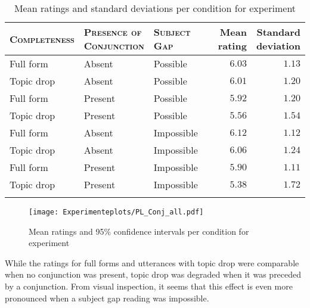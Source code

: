\begin{table}
\caption{Mean ratings and standard deviations per condition for experiment }
\centering
\begin{tabular}{lllrr}
\lsptoprule
\textsc{Completeness} & \Centerstack[l]{\textsc{Presence of}\\\textsc{Conjunction}} & \textsc{Subject Gap} & \Centerstack{Mean\\rating} & \Centerstack{Standard\\deviation} \\
\midrule
Full form & Absent & Possible &  $6.03$ &  $1.13$\\
Topic drop & Absent & Possible &  $6.01$ & $1.20$ \\
Full form & Present & Possible &  $5.92$ & $1.20$ \\
Topic drop & Present & Possible &  $5.56$ & $1.54$ \\
Full form & Absent & Impossible & $6.12$ &  $1.12$ \\
Topic drop & Absent & Impossible & $6.06$ & $1.24$ \\
Full form & Present & Impossible &  $5.90$ &  $1.11$\\
Topic drop & Present & Impossible & $5.38$ & $1.72$ \\
\lspbottomrule
\end{tabular}
\label{tab:descriptives.conjunctions}
\end{table}

\begin{figure}
\centering
\texttt{[image: Experimenteplots/PL\_Conj\_all.pdf]}
\caption{Mean ratings and 95\% confidence intervals per condition for experiment }
\label{fig:pl.conjunctions} %
\end{figure}

\noindent
While the ratings for full forms and utterances with topic drop were comparable when no conjunction was present, topic drop was degraded when it was preceded by a conjunction.
From visual inspection, it seems that this effect is even more pronounced when a subject gap reading was impossible.

